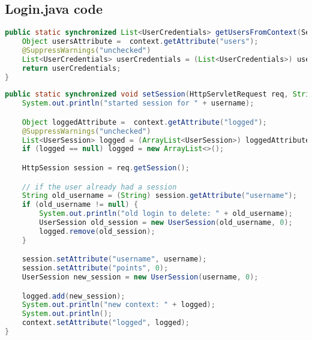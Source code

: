\subsection{Login.java code}
\begin{lstlisting}[language=java, caption={method to get the user credentials from the context}]
public static synchronized List<UserCredentials> getUsersFromContext(ServletContext context) {
    Object usersAttribute =  context.getAttribute("users");
    @SuppressWarnings("unchecked")
    List<UserCredentials> userCredentials = (List<UserCredentials>) usersAttribute;
    return userCredentials;
}
\end{lstlisting}
\begin{lstlisting}[language=java, caption={method to set the user session}]
public static synchronized void setSession(HttpServletRequest req, String username, ServletContext context){
    System.out.println("started session for " + username);

    Object loggedAttribute =  context.getAttribute("logged");
    @SuppressWarnings("unchecked")
    List<UserSession> logged = (ArrayList<UserSession>) loggedAttribute;
    if (logged == null) logged = new ArrayList<>();

    HttpSession session = req.getSession();

    // if the user already had a session
    String old_username = (String) session.getAttribute("username");
    if (old_username != null) {
        System.out.println("old login to delete: " + old_username);
        UserSession old_session = new UserSession(old_username, 0);
        logged.remove(old_session);
    }

    session.setAttribute("username", username);
    session.setAttribute("points", 0);
    UserSession new_session = new UserSession(username, 0);

    logged.add(new_session);
    System.out.println("new context: " + logged);
    System.out.println();
    context.setAttribute("logged", logged);
} 
\end{lstlisting}
